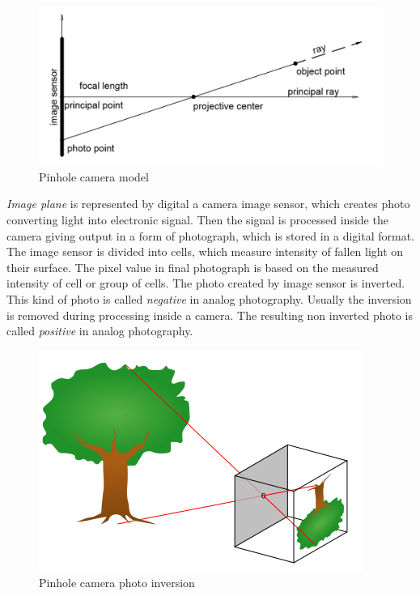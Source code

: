 \documentclass[a4paper,12pt]{article}
\newcommand{\term}[1]{
{\it #1}%
}
\begin{document}
\begin{figure}[h]
    \centering
    \includegraphics[scale=0.3]{figures/pinhole_camera.png}
    \caption{Pinhole camera model}
\end{figure}



\term{Image plane} is represented by digital a camera image sensor, which  creates photo converting light into electronic signal.
Then the signal is processed inside the camera giving output in a form of photograph, which is stored in a digital format. 
The image sensor is divided into cells, which measure intensity of fallen light on their surface. The pixel value in final 
photograph is based on the measured intensity of cell or group of cells. The photo created by image sensor is inverted. This kind 
of photo is called \term{negative} in analog photography.  Usually the inversion is removed during processing inside a
camera. The resulting non inverted photo is called \term{positive} in analog photography. 

\begin{figure}[h]
    \centering
    \includegraphics[scale=0.4]{figures/pinhole_camera_inversion.png}
    \caption{Pinhole camera photo inversion \cite{mellish2005pinhole}}
\end{figure}
\end{document}
